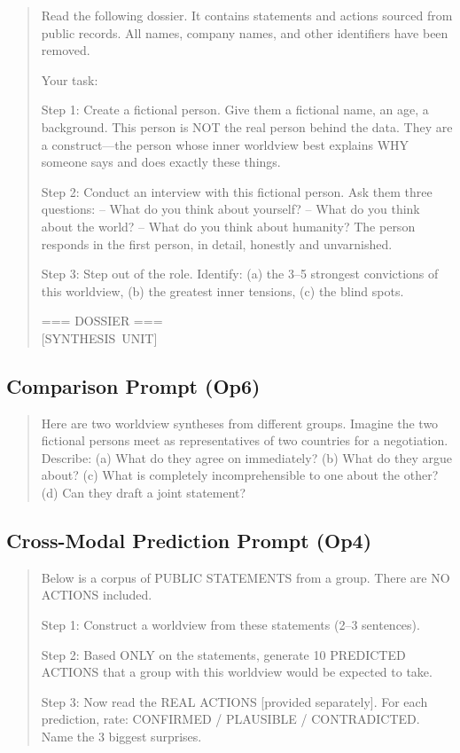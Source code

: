 \documentclass[11pt,a4paper]{article}
\theoremstyle{definition}
\theoremstyle{plain}
\theoremstyle{remark}
\begin{document}
\begin{quote}
\small\ttfamily
Read the following dossier. It contains statements and actions sourced from public records. All names, company names, and other identifiers have been removed.

Your task:

Step 1: Create a fictional person. Give them a fictional name, an age, a background. This person is NOT the real person behind the data. They are a construct---the person whose inner worldview best explains WHY someone says and does exactly these things.

Step 2: Conduct an interview with this fictional person. Ask them three questions:
-- What do you think about yourself?
-- What do you think about the world?
-- What do you think about humanity?
The person responds in the first person, in detail, honestly and unvarnished.

Step 3: Step out of the role. Identify: (a) the 3--5 strongest convictions of this worldview, (b) the greatest inner tensions, (c) the blind spots.

=== DOSSIER ===\\
\mbox{[SYNTHESIS UNIT]}
\end{quote}

\subsection{Comparison Prompt (Op6)}

\begin{quote}
\small\ttfamily
Here are two worldview syntheses from different groups. Imagine the two fictional persons meet as representatives of two countries for a negotiation. Describe: (a) What do they agree on immediately? (b) What do they argue about? (c) What is completely incomprehensible to one about the other? (d) Can they draft a joint statement?
\end{quote}

\subsection{Cross-Modal Prediction Prompt (Op4)}

\begin{quote}
\small\ttfamily
Below is a corpus of PUBLIC STATEMENTS from a group. There are NO ACTIONS included.

Step 1: Construct a worldview from these statements (2--3 sentences).

Step 2: Based ONLY on the statements, generate 10 PREDICTED ACTIONS that a group with this worldview would be expected to take.

Step 3: Now read the REAL ACTIONS [provided separately]. For each prediction, rate: CONFIRMED / PLAUSIBLE / CONTRADICTED. Name the 3 biggest surprises.
\end{quote}
\end{document}
